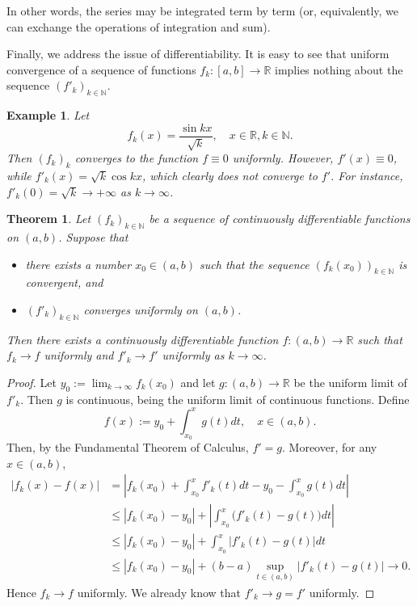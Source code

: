 \documentclass[a4paper,reqno]{amsart}
\numberwithin{equation}{section}
\newtheorem{theorem}[definition]{Theorem}
\newtheorem{example}[definition]{Example}
\def\N{\mathbb{N}}
\def\R{\mathbb{R}}
\begin{document}
In other words, the series may be integrated term by term (or, equivalently, we can exchange the operations of integration and sum).



\medskip

Finally, we address the issue of differentiability. It is easy to see that uniform convergence of a sequence of functions $f_k:[a,b] \to \R$ implies nothing about the sequence 
$(f'_k)_{k\in \N}$. 

\begin{example}
Let 
$$
f_k(x) = \frac{\sin kx}{\sqrt k}, \quad x\in \R, k\in \N.
$$
Then $(f_k)_k$ converges to the function $f\equiv 0$ uniformly. However, $f'(x)\equiv 0$, while $f'_k(x) = \sqrt k\cos kx$, which clearly does not converge to $f'$. For instance, 
$f'_k(0)=\sqrt k \to +\infty$ as $k\to \infty$.
\end{example}



\begin{theorem}\label{uniform:differentiability}
Let $(f_k)_{k\in \mathbb{N}}$ be a sequence of continuously differentiable functions on $(a, b)$. Suppose that
\begin{itemize}
\item[(i)] there exists a number $x_0 \in (a, b)$ such that the sequence $(f_k(x_0))_{k\in \mathbb{N}}$ is convergent, and
\item[(ii)] $(f'_k)_{k\in \mathbb{N}}$ converges uniformly on $(a,b)$.
\end{itemize}
Then there exists a continuously differentiable function $f : (a, b) \to \R$ such that $f_k \to f$ uniformly and $f'_k \to f'$ uniformly as $k \to \infty$.
\end{theorem}

\begin{proof}
Let $y_0:=\lim_{k\to\infty} f_k(x_0)$ and let $g : (a, b) \to \R$ be the uniform limit of $f'_k$. Then $g$ is continuous, being the uniform limit of continuous functions.
Define
$$
f(x):= y_0 + \int_{x_0}^x g(t) dt, \quad x\in (a,b).
$$
Then, by the Fundamental Theorem of Calculus, $f'=g$. Moreover, for any $x\in (a,b)$,
\begin{align*}
|f_k(x) - f(x)|&= \left|f_k(x_0)+\int_{x_0}^x f'_k(t) dt - y_0 - \int_{x_0}^x g(t) dt\right|\\
&\leq |f_k(x_0)-y_0|+ \left| \int_{x_0}^x \Big(f'_k(t) - g(t)\Big) dt \right|\\
&\leq |f_k(x_0)-y_0|+  \int_{x_0}^x \Big|f'_k(t) - g(t)\Big| dt \\
&\leq |f_k(x_0)-y_0|+  (b-a)\sup_{t\in (a,b)}\Big|f'_k(t) - g(t)\Big| \to 0.
\end{align*}
Hence $f_k \to f$ uniformly. We already know that $f'_k \to g = f'$ uniformly.
\end{proof}
\end{document}
